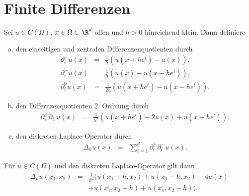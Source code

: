 \section{Finite Differenzen}


\begin{Definition}
    \label{def:2.1}
    Sei $u\in C(\Omega)$, $x\in \Omega\subset \R^d$ offen und $h > 0$
    hinreichend klein. Dann definiere
    \begin{enumerate}[a)]
	\item
	    den einseitigen und zentralen Differenzenquotienten durch
	    \begin{eqnarray*}
                \partial_i^+ u(x)
            &=& \frac{1}{h} \left(u\left(x + h e^i\right) - u(x)\right), \\
                \partial_i^- u(x)
            &=& \frac{1}{h} \left(u(x) - u\left(x - h e^i\right)\right), \\
                \partial_i^0 u(x)
            &=& \frac{1}{2h} \left(u\left(x + h e^i\right)
                - u\left(x - h e^i\right)\right).
	    \end{eqnarray*}
	\item
	    den Differnzenquotienten 2. Ordnung durch
	    \begin{eqnarray*}
                \partial_i^+ \partial_i^- u(x)
            &=& \frac{1}{h^2} \left(u\left(x + h e^i\right) - 2u(x)
                + u\left(x - h e^i\right)\right).
	    \end{eqnarray*}
	\item
	    den diskreten Laplace-Operator durch
	    \begin{eqnarray*}
                \Delta_h u(x)
            &=& \sum_{i=1}^d \partial_i^+ \partial_i^- u(x).
	    \end{eqnarray*}
    \end{enumerate}
\end{Definition}


\begin{Beispiel}
    Für $u\in C(\Omega)$ und den diskreten Laplace-Operator gilt dann
    \begin{eqnarray*}
            \Delta_h u(x_1, x_2)
        &=& \frac{1}{h^2} (u(x_1 + h, x_2) + u(x_1 - h, x_2) - 4u(x) \\
            && + u(x_1, x_2 + h) + u(x_1, x_2 - h)).
    \end{eqnarray*}
\end{Beispiel}


